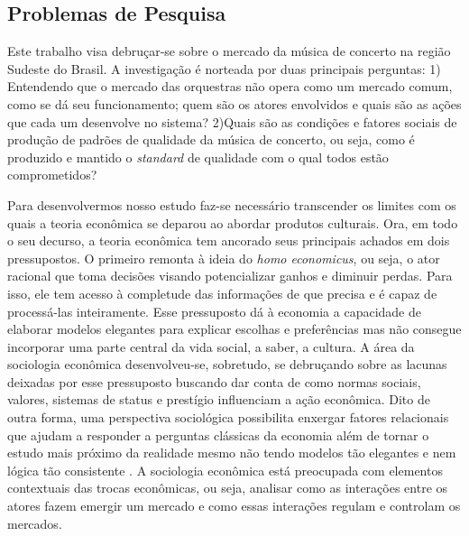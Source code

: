 \documentclass[a4paper, 12pt, openright, oneside, german, french, english, brazil]{abntex2}
\begin{document}
	
	
	\subsection*{Problemas de Pesquisa}
	
	Este trabalho visa debruçar-se sobre o mercado da música de concerto na região Sudeste do Brasil. A investigação é norteada por duas principais perguntas: 1) Entendendo que o mercado das orquestras não opera como um mercado comum, como se dá seu funcionamento; quem são os atores envolvidos e quais são as ações que cada um desenvolve no sistema? 2)Quais são as condições e fatores sociais de produção de padrões de qualidade da música de concerto, ou seja, como é produzido e mantido o \textit{standard} de qualidade com o qual todos estão comprometidos?
	
	Para desenvolvermos nosso estudo faz-se necessário transcender os limites com os quais a teoria econômica se deparou ao abordar produtos culturais. Ora, em todo o seu decurso, a teoria econômica tem ancorado seus principais achados em dois pressupostos. O primeiro remonta à ideia do \textit{homo economicus}, ou seja, o ator racional que toma decisões visando potencializar ganhos e diminuir perdas. Para isso, ele tem acesso à completude das informações de que precisa e é capaz de processá-las inteiramente. Esse pressuposto dá à economia a capacidade de elaborar modelos elegantes para explicar escolhas e preferências mas não consegue incorporar uma parte central da vida social, a saber, a cultura. A área da sociologia econômica desenvolveu-se, sobretudo, se debruçando sobre as lacunas deixadas por esse pressuposto buscando dar conta de como normas sociais, valores, sistemas de status e prestígio influenciam a ação econômica. Dito de outra forma, uma perspectiva sociológica possibilita enxergar fatores relacionais que ajudam a responder a perguntas clássicas da economia além de tornar o estudo mais próximo da realidade mesmo não tendo modelos tão elegantes e nem lógica tão consistente \cite{hirsch1987dirty}. A sociologia econômica está preocupada com elementos contextuais das trocas econômicas, ou seja, analisar como as interações entre os atores fazem emergir um mercado e como essas interações regulam e controlam os mercados.
	
	
	
	
	
\end{document}
